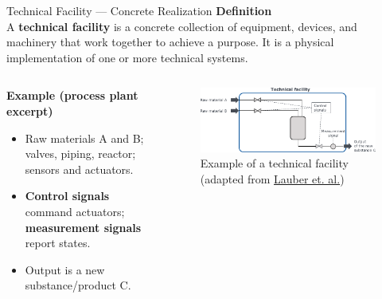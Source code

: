 \begin{frame}{Technical Facility — Concrete Realization}
\textbf{Definition}\\
A \textbf{technical facility} is a concrete collection of equipment, devices, and machinery that work together to achieve a purpose. It is a physical implementation of one or more technical systems.

\vspace{1.5mm}
\begin{columns}
	\begin{column}{0.55\textwidth}
		\textbf{Example (process plant excerpt)}
		\begin{itemize}
		\item Raw materials A and B; valves, piping, reactor; sensors and actuators.
		\item \textbf{Control signals} command actuators; \textbf{measurement signals} report states.
		\item Output is a new substance/product C.
		\end{itemize}
	\end{column}
	\begin{column}{0.45\textwidth}
		\begin{figure}
			\centering
			\includegraphics[width=\linewidth]{fig/lec01/tech_facility.pdf}
			\caption*{Example of a technical facility (adapted from \href{https://doi. org/10.1007/978-3-642-58446-6}{Lauber et. al.})}
		\end{figure}
	\end{column}
\end{columns}
\end{frame}

